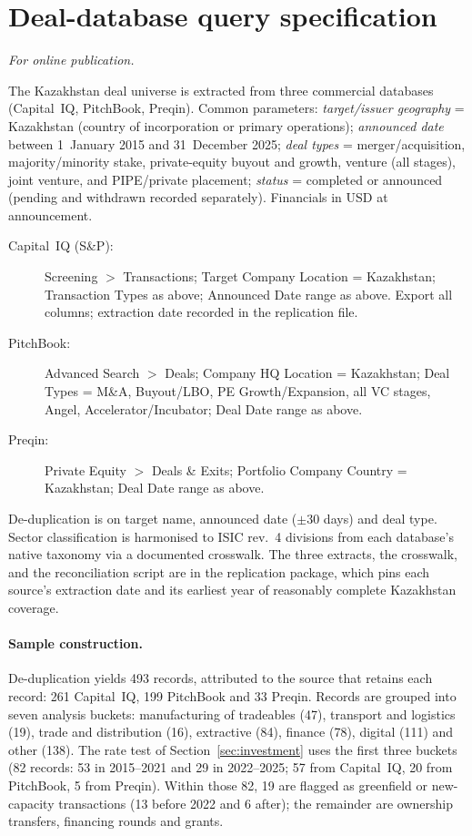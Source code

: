 \documentclass[12pt]{article}
\begin{document}
\appendix
\renewcommand{\thesection}{\Alph{section}}

\section{Deal-database query specification}\label{app:deals}
\emph{For online publication.}

\medskip
The Kazakhstan deal universe is extracted from three commercial databases (Capital~IQ,
PitchBook, Preqin). Common parameters: \emph{target/issuer geography} = Kazakhstan (country of
incorporation or primary
operations); \emph{announced date} between 1~January 2015 and 31~December 2025; \emph{deal
types} = merger/acquisition, majority/minority stake, private-equity buyout and growth,
venture (all stages), joint venture, and PIPE/private placement; \emph{status} = completed or
announced (pending and withdrawn recorded separately). Financials in USD at announcement.

\begin{description}
\item[Capital~IQ (S\&P):] Screening $>$ Transactions; Target Company Location = Kazakhstan;
Transaction Types as above; Announced Date range as above. Export all columns; extraction date
recorded in the replication file.
\item[PitchBook:] Advanced Search $>$ Deals; Company HQ Location = Kazakhstan; Deal Types =
M\&A, Buyout\slash LBO, PE Growth\slash Expansion, all VC stages, Angel,
Accelerator\slash Incubator; Deal Date range as above.
\item[Preqin:] Private Equity $>$ Deals \& Exits; Portfolio Company Country = Kazakhstan; Deal
Date range as above.
\end{description}

De-duplication is on target name, announced date ($\pm$30 days) and deal type. Sector
classification is harmonised to ISIC rev.~4 divisions from each database's native taxonomy via
a documented crosswalk. The three extracts, the crosswalk, and the reconciliation script are
in the replication package, which pins each source's extraction date and its earliest year of reasonably complete Kazakhstan coverage.

\paragraph{Sample construction.} De-duplication yields 493 records, attributed to the source that retains each record: 261 Capital~IQ, 199 PitchBook and 33 Preqin. Records are grouped into seven analysis buckets: manufacturing of tradeables (47), transport and logistics (19), trade and distribution (16), extractive (84), finance (78), digital (111) and other (138). The rate test of Section~\ref{sec:investment} uses the first three buckets (82 records: 53 in 2015--2021 and 29 in 2022--2025; 57 from Capital~IQ, 20 from PitchBook, 5 from Preqin). Within those 82, 19 are flagged as greenfield or new-capacity transactions (13 before 2022 and 6 after); the remainder are ownership transfers, financing rounds and grants.
\end{document}
